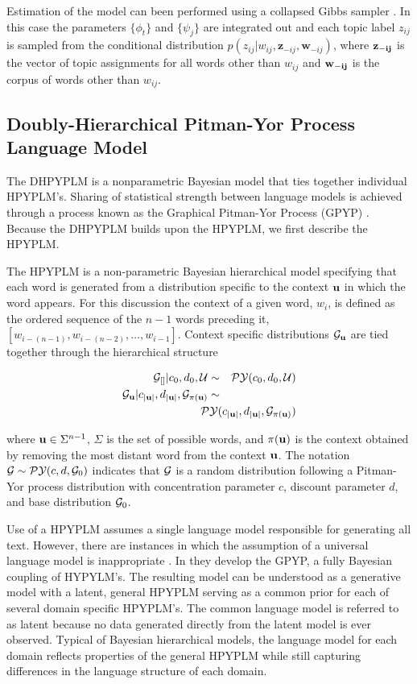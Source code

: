 Estimation of the model can been performed using a collapsed Gibbs sampler \cite{Griffiths2004}.  In this case the parameters $\{ \phi_t \}$ and $\{ \psi_j \}$ are integrated out and each topic label $z_{ij}$ is sampled from the conditional distribution $p(z_{ij} | w_{ij}, \mathbf{z}_{-ij}, \mathbf{w}_{-ij})$, where $\bf{z_{-ij}}$ is the vector of topic assignments for all words other than $w_{ij}$ and $\bf{w_{-ij}}$ is the corpus of words other than $w_{ij}$.

\subsection{Doubly-Hierarchical Pitman-Yor Process Language Model}

The DHPYPLM is a nonparametric Bayesian model that ties together individual HPYPLM's. Sharing of statistical strength between language models is achieved through a process known as the Graphical Pitman-Yor Process (GPYP) \cite{Wood2009a}.  Because the DHPYPLM builds upon the HPYPLM, we first describe the HPYPLM.

The HPYPLM is a non-parametric Bayesian hierarchical model specifying that each word is generated from a distribution specific to the context ${\bf u}$ in which the word appears.  For this discussion the context of a given word, $w_i$, is  defined as the ordered sequence of the $n-1$ words preceding it, $[w_{i - (n-1)}, w_{i-(n-2)}, \ldots, w_{i-1}]$.  Context specific distributions $\G_{\bu}$ are tied together through the hierarchical structure

\begin{eqnarray}
\G_{[]}| c_0, d_0, \mathcal{U} &\sim& \PY(c_0, d_0, \mathcal{U}) \nonumber \\
\G_\bu | c_{|\bu|}, d_{|\bu|}, \G_{\pi (\bu)} &\sim&  \nonumber \\
& & \hspace{-1cm} \PY( c_{|\bu|}, d_{|\bu|},  \G_{\pi (\bu)})  \label{eqn:hpyplm}
\end{eqnarray}

where $\bu \in \Sigma^{n-1}$, $\Sigma$ is the set of possible words, and $\pi(\bu)$ is the context obtained by removing the most distant word from the context $\bu$.  The notation $\G \sim \PY(c,d,\G_0)$ indicates that $\G$ is a random distribution following a Pitman-Yor process distribution with concentration parameter $c$, discount parameter $d$, and base distribution $\G_0$.

Use of a HPYPLM assumes a single language model responsible for generating all text.  However, there are instances in which the assumption of a universal language model is inappropriate \cite{Rosenfeld2000}.  In \cite{Wood2009a} they develop the GPYP, a fully Bayesian coupling of HYPYLM's. The resulting model can be understood as a generative model with a latent, general HPYPLM serving as a common prior for each of several domain specific HPYPLM's.  The common language model is referred to as latent because no data generated directly from the latent model is ever observed.  Typical of Bayesian hierarchical models, the language model for each domain reflects properties of the general HPYPLM while still capturing differences in the language structure of each domain.  

